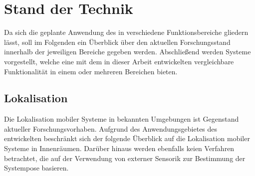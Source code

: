 \chapter{Stand der Technik}
\label{chap:tech}
\red[TODO:\\
Bilder von Systemen?\\
]


Da sich die geplante Anwendung des  in verschiedene Funktionsbereiche gliedern lässt, soll im Folgenden ein Überblick über den aktuellen Forschungsstand innerhalb der jeweiligen Bereiche gegeben werden. Abschließend werden Systeme vorgestellt, welche eine mit dem in dieser Arbeit entwickelten \kps{} vergleichbare Funktionalität in einem oder mehreren Bereichen bieten.

\section{Lokalisation\red[/Lokalisationsverfahren]}
\label{chap:mcl}
Die Lokalisation mobiler Systeme in bekannten Umgebungen ist Gegenstand aktueller Forschungsvorhaben. Aufgrund des Anwendungsgebietes des entwickelten  beschränkt sich der folgende Überblick auf die Lokalisation mobiler Systeme in Innenräumen. Darüber hinaus werden ebenfalls keien Verfahren betrachtet, die auf der Verwendung von externer Sensorik zur Bestimmung der Systempose basieren.\\

